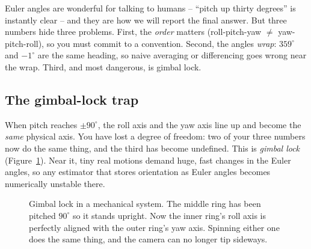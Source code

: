 Euler angles are wonderful for talking to humans -- ``pitch up thirty degrees'' is
instantly clear -- and they are how we will report the final answer. But three numbers
hide three problems. First, the \emph{order} matters (roll-pitch-yaw $\neq$
yaw-pitch-roll), so you must commit to a convention. Second, the angles \emph{wrap}:
$359^\circ$ and $-1^\circ$ are the same heading, so naive averaging or differencing
goes wrong near the wrap. Third, and most dangerous, is gimbal lock.

\subsection{The gimbal-lock trap}
\label{ch36:gimbal}

\begin{trapbox}
When pitch reaches $\pm 90^\circ$, the roll axis and the yaw axis line up and become
the \emph{same} physical axis. You have lost a degree of freedom: two of your three
numbers now do the same thing, and the third has become undefined. This is
\emph{gimbal lock} (Figure~\ref{ch36:fig-gimbal-lock}). Near it, tiny real motions demand huge, fast changes in the Euler
angles, so any estimator that stores orientation as Euler angles becomes numerically
unstable there.
\end{trapbox}

\begin{figure}[htbp]
\centering
{}
\caption{Gimbal lock in a mechanical system. The middle ring has been pitched $90^\circ$ so it stands upright. Now the inner ring's roll axis is perfectly aligned with the outer ring's yaw axis. Spinning either one does the same thing, and the camera can no longer tip sideways.}
\label{ch36:fig-gimbal-lock}
\end{figure}

